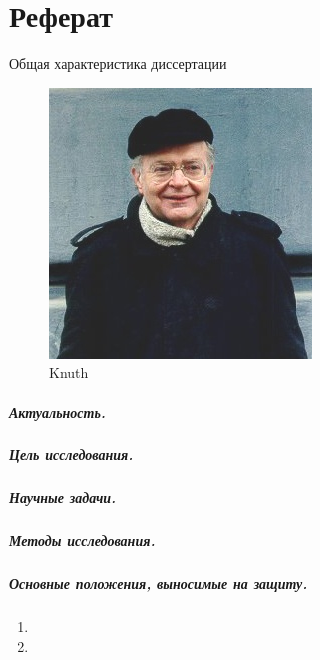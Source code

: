 \chapter*{Реферат}

\begin{center}
    Общая характеристика диссертации
\end{center}

\begin{figure}
    \centering
    \includegraphics[width=0.6\linewidth]{images/knuth}
    \caption{Knuth}
    \label{fig:my_label2}
\end{figure}


\paragraph*{Актуальность.}

\paragraph*{Цель исследования.}
\paragraph*{Научные задачи.}

\paragraph*{Методы исследования.}


\paragraph*{Основные положения, выносимые на защиту.}
\begin{enumerate}
    \item \statementOneRU
    \item \statementTwoRU 
\end{enumerate}

